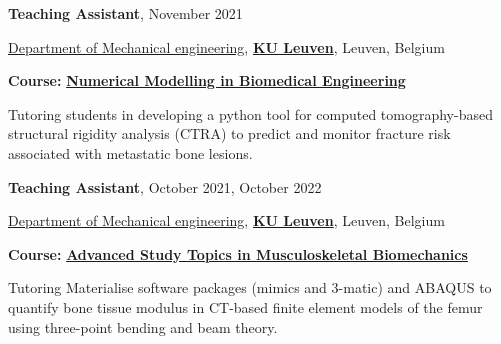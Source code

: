 \documentclass[8pt]{article}
\newcommand{\halfblankline}{\quad\vspace{-0.5\baselineskip}\pagebreak[3]}
\begin{document}
\textbf{Teaching Assistant}, {November 2021}
\begin{innerlist}
	\item[] \href{https://www.mech.kuleuven.be/en}{Department of Mechanical engineering}, \href{https://www.kuleuven.be/english/kuleuven}{\textbf{KU Leuven}}, Leuven, Belgium
	\begin{innerlist}
		\item[] \textbf{Course:} \href{https://onderwijsaanbod.kuleuven.be//syllabi/e/H0N44AE.htm#activetab=doelstellingen_idp65744} {\textbf{Numerical Modelling in Biomedical Engineering}}
    \begin{innerlist}
      	  \item   Tutoring students in developing a python tool for computed tomography-based structural rigidity analysis (CTRA) to predict and monitor fracture risk associated with metastatic bone lesions. 
 
    \end{innerlist}

		
	\end{innerlist}
\end{innerlist}

\halfblankline



\textbf{Teaching Assistant}, {October 2021, October 2022}
\begin{innerlist}
	\item[] \href{https://www.mech.kuleuven.be/en}{Department of Mechanical engineering}, \href{https://www.kuleuven.be/english/kuleuven}{\textbf{KU Leuven}}, Leuven, Belgium
	\begin{innerlist}
		\item[] \textbf{Course:} \href{https://onderwijsaanbod.kuleuven.be//syllabi/e/H06X2AE.htm#activetab=doelstellingen_idp59688} {\textbf{Advanced Study Topics in Musculoskeletal Biomechanics}}
    \begin{innerlist}
      	  \item   Tutoring Materialise software packages (mimics and 3-matic) and ABAQUS to quantify bone tissue modulus in CT-based finite element models of the femur using three-point bending and beam theory. 
 
    \end{innerlist}
	
	\end{innerlist}
\end{innerlist}

\halfblankline
\end{document}
